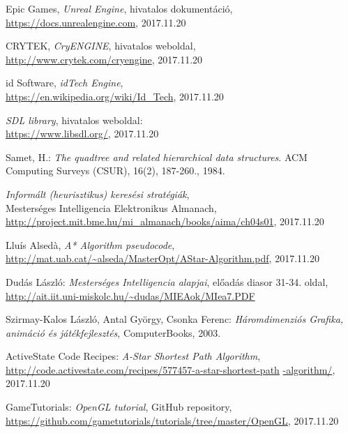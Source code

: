 \begin{thebibliography}{x}

Epic Games, \emph{Unreal Engine}, hivatalos dokumentáció, \\
\url{https://docs.unrealengine.com}, 2017.11.20

CRYTEK, \emph{CryENGINE}, hivatalos weboldal, \\
\url{http://www.crytek.com/cryengine}, 2017.11.20

id Software, \emph{idTech Engine}, \\
\url{https://en.wikipedia.org/wiki/Id\_Tech}, 2017.11.20

\emph{SDL library}, hivatalos weboldal: \\
\url{https://www.libsdl.org/}, 2017.11.20

Samet, H.: \emph{The quadtree and related hierarchical data structures}. ACM Computing Surveys (CSUR), 16(2), 187-260., 1984.

\emph{Informált (heurisztikus) keresési stratégiák}, \\
Mesterséges Intelligencia Elektronikus Almanach, \\
\url{http://project.mit.bme.hu/mi\_almanach/books/aima/ch04s01}, 2017.11.20

Lluís Alsedà, \emph{A* Algorithm pseudocode}, \\
\url{http://mat.uab.cat/~alseda/MasterOpt/AStar-Algorithm.pdf},
2017.11.20

Dudás László: \emph{Mesterséges Intelligencia alapjai}, előadás diasor 31-34. oldal, \\
\url{http://ait.iit.uni-miskolc.hu/~dudas/MIEAok/MIea7.PDF}

Szirmay-Kalos László, Antal György, Csonka Ferenc:
\emph{Háromdimenziós Grafika, animáció és játékfejlesztés}, ComputerBooks, 2003.

ActiveState Code Recipes: \emph{A-Star Shortest Path Algorithm}, \\
\url{http://code.activestate.com/recipes/577457-a-star-shortest-path} \url{-algorithm/}, 2017.11.20

\newpage

GameTutorials: \emph{OpenGL tutorial}, GitHub repository, \\
\url{https://github.com/gametutorials/tutorials/tree/master/OpenGL}, 2017.11.20


\end{thebibliography}

